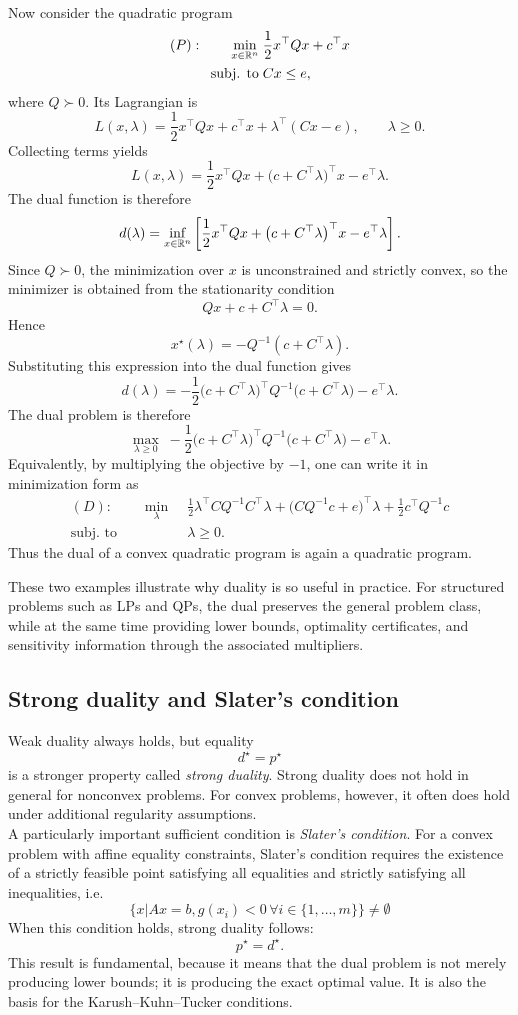 Now consider the quadratic program
\[
\begin{aligned}
(P):\qquad
\min_{x\in\mathbb{R}^n}\;& \frac12 x^\top Qx + c^\top x\\
\text{subj. to}\;& Cx\le e,
\end{aligned}
\]
where \(Q\succ 0\). Its Lagrangian is
\[
L(x,\lambda)
=
\frac12 x^\top Qx + c^\top x + \lambda^\top(Cx-e),
\qquad \lambda\ge 0.
\]
Collecting terms yields
\[
L(x,\lambda)
=
\frac12 x^\top Qx + \bigl(c + C^\top\lambda\bigr)^\top x - e^\top \lambda.
\]
The dual function is therefore
\[
d(\lambda)
=
\inf_{x\in\mathbb{R}^n}
\left[
\frac12 x^\top Qx + \bigl(c + C^\top\lambda\bigr)^\top x - e^\top \lambda
\right].
\]
Since \(Q\succ 0\), the minimization over \(x\) is unconstrained and strictly convex, so the
minimizer is obtained from the stationarity condition
\[
Qx + c + C^\top \lambda = 0.
\]
Hence
\[
x^\star(\lambda) = -Q^{-1}(c + C^\top \lambda).
\]
Substituting this expression into the dual function gives
\[
d(\lambda)
=
-\frac12
\bigl(c + C^\top \lambda\bigr)^\top
Q^{-1}
\bigl(c + C^\top \lambda\bigr)
-
e^\top \lambda.
\]
The dual problem is therefore
\[
\max_{\lambda\ge 0}\;
-\frac12
\bigl(c + C^\top \lambda\bigr)^\top
Q^{-1}
\bigl(c + C^\top \lambda\bigr)
-
e^\top \lambda.
\]
Equivalently, by multiplying the objective by \(-1\), one can write it in minimization form as
\[
\begin{aligned}
(D):\qquad
\min_{\lambda}\;&
\frac12 \lambda^\top C Q^{-1} C^\top \lambda
+
\bigl(CQ^{-1}c + e\bigr)^\top \lambda
+
\frac12 c^\top Q^{-1} c\\
\text{subj. to}\;& \lambda\ge 0.
\end{aligned}
\]
Thus the dual of a convex quadratic program is again a quadratic program.

These two examples illustrate why duality is so useful in practice. For structured problems such
as LPs and QPs, the dual preserves the general problem class, while at the same time providing
lower bounds, optimality certificates, and sensitivity information through the associated
multipliers.

\subsection{Strong duality and Slater's condition}

Weak duality always holds, but equality
\[
d^\star = p^\star
\]
is a stronger property called \emph{strong duality}. Strong duality does not hold in general for nonconvex problems. For convex problems, however, it often does hold under additional regularity assumptions.\\
A particularly important sufficient condition is \emph{Slater's condition}. For a convex problem with affine equality constraints, Slater's condition requires the existence of a strictly feasible point satisfying all equalities and strictly satisfying all inequalities, i.e.
$$\{ x | Ax = b , g(x_i) < 0 \, \forall i \in \{1,\dots,m \} \} \not= \emptyset $$ 
When this condition holds, strong duality follows:
\[
p^\star = d^\star.
\]
This result is fundamental, because it means that the dual problem is not merely producing lower bounds; it is producing the exact optimal value. It is also the basis for the Karush--Kuhn--Tucker conditions.

